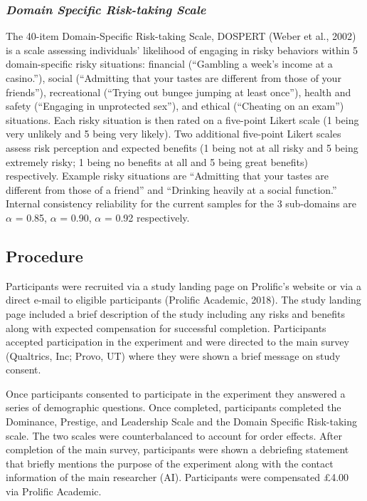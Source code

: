 \documentclass[
  donotrepeattitle,doc, 12pt, a4paper,floatsintext]{apa7}
\begin{document}
\hypertarget{domain-specific-risk-taking-scale}{%
\subsubsection{\texorpdfstring{\emph{Domain Specific Risk-taking Scale}}{Domain Specific Risk-taking Scale}}\label{domain-specific-risk-taking-scale}}

The 40-item Domain-Specific Risk-taking Scale, DOSPERT (Weber et al., 2002) is a scale assessing individuals' likelihood of engaging in risky behaviors within 5 domain-specific risky situations: financial (``Gambling a week's income at a casino.''), social (``Admitting that your tastes are different from those of your friends''), recreational (``Trying out bungee jumping at least once''), health and safety (``Engaging in unprotected sex''), and ethical (``Cheating on an exam'') situations. Each risky situation is then rated on a five-point Likert scale (1 being very unlikely and 5 being very likely). Two additional five-point Likert scales assess risk perception and expected benefits (1 being not at all risky and 5 being extremely risky; 1 being no benefits at all and 5 being great benefits) respectively. Example risky situations are ``Admitting that your tastes are different from those of a friend'' and ``Drinking heavily at a social function.'' Internal consistency reliability for the current samples for the 3 sub-domains are \(\alpha\) = 0.85, \(\alpha\) = 0.90, \(\alpha\) = 0.92 respectively.

\hypertarget{procedure}{%
\subsection{Procedure}\label{procedure}}

Participants were recruited via a study landing page on Prolific's website or via a direct e-mail to eligible participants (Prolific Academic, 2018). The study landing page included a brief description of the study including any risks and benefits along with expected compensation for successful completion. Participants accepted participation in the experiment and were directed to the main survey (Qualtrics, Inc; Provo, UT) where they were shown a brief message on study consent.

Once participants consented to participate in the experiment they answered a series of demographic questions. Once completed, participants completed the Dominance, Prestige, and Leadership Scale and the Domain Specific Risk-taking scale. The two scales were counterbalanced to account for order effects. After completion of the main survey, participants were shown a debriefing statement that briefly mentions the purpose of the experiment along with the contact information of the main researcher (AI). Participants were compensated £4.00 via Prolific Academic.
\end{document}
